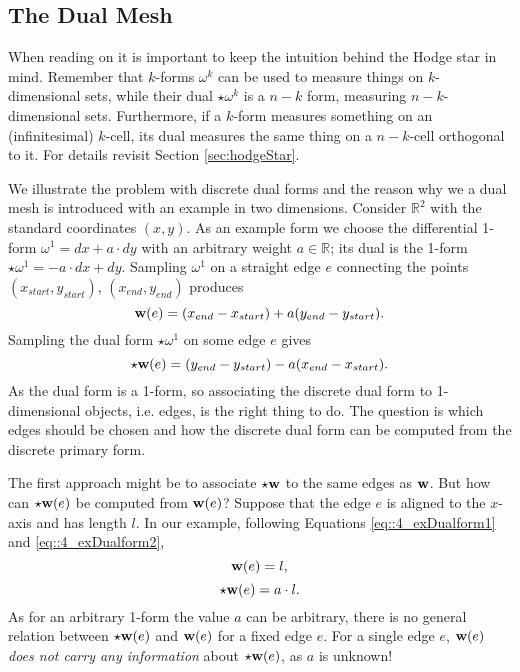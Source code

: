 \subsection{The Dual Mesh}

When reading on it is important to keep the intuition behind the Hodge star in mind. Remember that $k$-forms $\omega^k$ can be used to measure things on $k$-dimensional sets, while their dual $\star \omega^k$ is a $n-k$ form, measuring $n-k$-dimensional sets. Furthermore, if a $k$-form measures something on an (infinitesimal) $k$-cell, its dual measures the same thing on a $n-k$-cell orthogonal to it. For details revisit Section \ref{sec:hodgeStar}.

We illustrate the problem with discrete dual forms and the reason why we a dual mesh is introduced with an example in two dimensions. Consider $\mathbb R^2$ with the standard coordinates $(x,y)$. As an example form we choose the differential 1-form $\omega^1 = dx + a \cdot dy$ with an arbitrary weight $a\in \mathbb R$; its dual is the 1-form $\star \omega^1 = -a\cdot dx + dy$. Sampling $\omega^1$ on a straight edge $e$ connecting the points $(x_{start},y_{start})$, $(x_{end},y_{end})$ produces 
\begin{equation}\textbf{w}(e) = (x_{end} -x_{start}) + a (y_{end}-y_{start}).\label{eq::4_exDualform1}\end{equation}
Sampling the dual form $\star \omega^1$ on some edge $e$ gives
\begin{equation}\star\textbf{w}(e) = (y_{end} -y_{start}) - a (x_{end}-x_{start}).\label{eq::4_exDualform2}\end{equation}
As the dual form is a 1-form, so associating the discrete dual form to 1-dimensional objects, i.e. edges, is the right thing to do. The question is which edges should be chosen and how the discrete dual form can be computed from the discrete primary form. 

The first approach might be to associate $\star \textbf{w}$ to the same edges as $\textbf{w}$. But how can $\star\textbf{w}(e)$ be computed from $\textbf{w}(e)$? Suppose that the edge $e$ is aligned to the $x$-axis and has length $l$. In our example, following Equations \ref{eq::4_exDualform1} and \ref{eq::4_exDualform2}, $$\textbf{w}(e) = l,$$ 
$$\star \textbf{w}(e) =a \cdot l.$$ 
As for an arbitrary 1-form the value $a$ can be arbitrary, there is no general relation between $\star\textbf{w}(e)$ and $\textbf{w}(e)$ for a fixed edge $e$. For a single edge $e$, $\textbf{w}(e)$  \emph{does not carry any information} about $\star \textbf{w}(e)$, as $a$ is unknown! 

